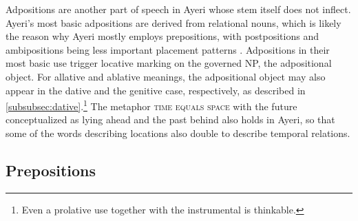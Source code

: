 Adpositions are another part of speech in Ayeri whose stem itself does not 
inflect. Ayeri's most basic adpositions are derived from relational nouns, 
which is likely the reason why Ayeri mostly employs prepositions, with 
postpositions and ambipositions being less important placement patterns 
\parencites[110--111]{hagege2010}[81\psqq]{lehmann2015}. Adpositions in their 
most basic use trigger locative marking on the governed NP, the adpositional
object. For allative and ablative meanings, the adpositional object may also
appear in the dative and the genitive case, respectively, as described in
\autoref{subsubsec:dative}.\footnote{Even a prolative use together with the
instrumental is thinkable.} The metaphor \textsc{time equals space} with the
future conceptualized as lying ahead and the past behind also holds in Ayeri,
so that some of the words describing locations also double to describe temporal
relations.

\subsection{Prepositions}
\label{subsec:prepositions}

